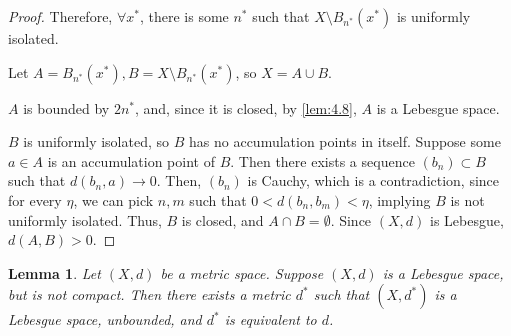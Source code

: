 \documentclass[openany, amssymb, psamsfonts]{amsart}
\let\fullref\autoref
\newtheorem{lem}{Lemma}[section]
\theoremstyle{definition}
\numberwithin{equation}{section}
\begin{document}
\begin{proof}
  Therefore, $\forall x^\ast$, there is some $n^\ast$ such that $X \setminus B_{n^\ast}(x^\ast)$ is uniformly isolated. 

  Let $A = B_{n^\ast}(x^\ast), B = X \setminus B_{n^\ast}(x^\ast)$, so $X = A \cup B$. 

  $A$ is bounded by $2n^\ast$, and, since it is closed, by \fullref{lem:4.8}, $A$ is a Lebesgue space.

  $B$ is uniformly isolated, so $B$ has no accumulation points in itself. Suppose some $a \in A$ is an accumulation point of $B$. Then there exists a sequence $(b_n)\subset B$ such that $d(b_n, a) \to 0$. Then, $(b_n)$ is Cauchy, which is a contradiction, since for every $\eta$, we can pick $n,m$ such that $0 < d(b_n,b_m) < \eta$, implying $B$ is not uniformly isolated. Thus, $B$ is closed, and $A \cap B = \emptyset$. Since $(X,d)$ is Lebesgue, $d(A,B) > 0$. 
\end{proof}
\begin{lem}\label{lem:4.11}
  Let $(X,d)$ be a metric space. Suppose $(X,d)$ is a Lebesgue space, but is not compact. Then there exists a metric $d^\ast$ such that $(X, d^\ast)$ is a Lebesgue space, unbounded, and $d^\ast$ is equivalent to $d$. 
\end{lem}
\end{document}
